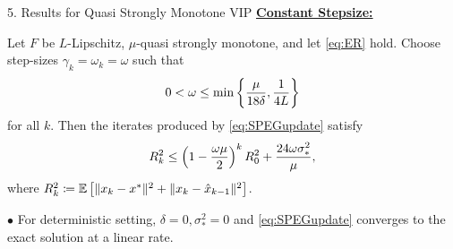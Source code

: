 \documentclass[24pt,final]{beamer}
\newlength{\onecolwid}
\newlength{\twocolwid}
\newcommand{\algname}[1]{{{\sf  #1}}}
\begin{document}
\begin{frame}[t]
\begin{columns}[t]
 
\begin{column}{\twocolwid} %

\vspace{-1.3cm}	

\begin{columns}[t,totalwidth=\twocolwid] %

  \begin{column}{\onecolwid}



\begin{block}{5. Results for Quasi Strongly Monotone VIP} 
\underline{\textbf{Constant Stepsize:}}
\begin{tcolorbox}[colback=green!5!white,colframe=green!50!black,title={Theorem}]
   Let $F$ be $L$-Lipschitz, $\mu$-quasi strongly monotone, and let \ref{eq:ER} hold.  Choose  step-sizes $\gamma_k = \omega_k = \omega$ such that 
\begin{equation*}\label{eq:constant_stepsize}
0 < \omega \leq \min \left\{ \frac{\mu}{18 \delta}, \frac{1}{4L}\right\}    
\end{equation*}
for all $k$. Then the iterates produced by \ref{eq:SPEGupdate} satisfy
\begin{equation*}
    R_{k}^2 \leq \left(1 - \frac{\omega\mu}{2}\right)^{k} R_0^2 + \frac{24\omega \sigma_*^2}{\mu}, \label{eq:SPEG_const_steps_neighborhood}
\end{equation*}
where $R_{k}^2 \coloneqq \mathbb{E}\left[ \|x_{k} - x^*\|^2 + \|x_{k} - \hat{x}_{k-1}\|^2 \right]$. 
\end{tcolorbox}
$\bullet$ For deterministic setting, $\delta = 0, \sigma_*^2 = 0$ and \ref{eq:SPEGupdate} converges to the exact solution at a linear rate.     


\end{block}
\end{column}
\end{columns}
\end{column}
\end{columns}
\end{frame}
\end{document}
